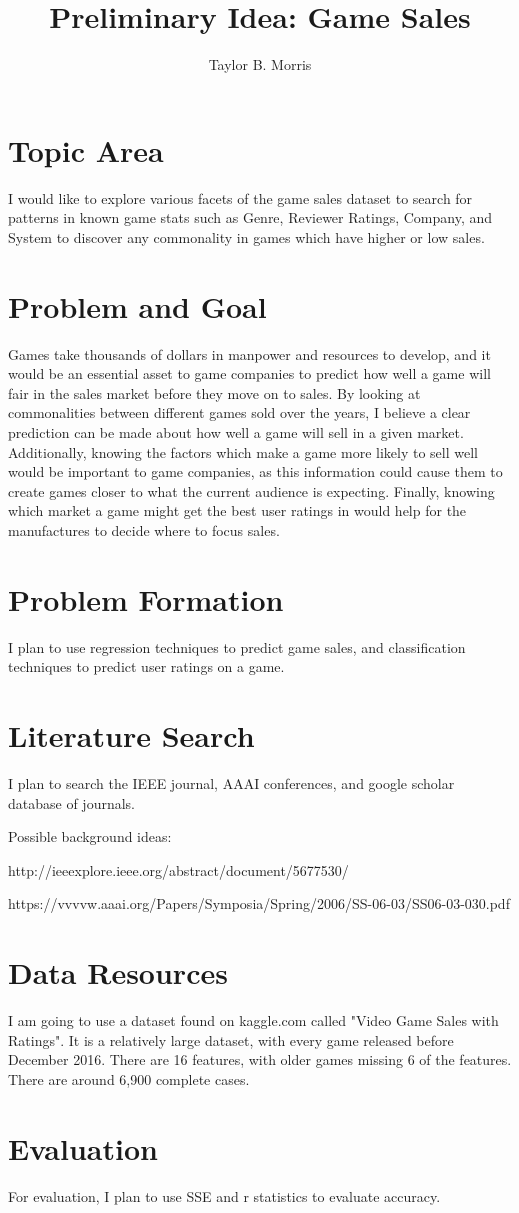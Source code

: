 \documentclass[12pt,letterpaper]{report}
\author{Taylor B. Morris}
\title{Preliminary Idea: Game Sales}
\begin{document}
\maketitle

\section{Topic Area}
I would like to explore various facets of the game sales dataset to search for patterns in known game stats such as Genre, Reviewer Ratings, Company, and System to discover any commonality in games which have higher or low sales. 

\section{Problem and Goal}
Games take thousands of dollars in manpower and resources to develop, and it would be an essential asset to game companies to predict how well a game will fair in the sales market before they move on to sales. By looking at commonalities between different games sold over the years, I believe a clear prediction can be made about how well a game will sell in a given market. Additionally, knowing the factors which make a game more likely to sell well would be important to game companies, as this information could cause them to create games closer to what the current audience is expecting. Finally, knowing which market a game might get the best user ratings in would help for the manufactures to decide where to focus sales.

\section{Problem Formation}
I plan to use regression techniques to predict game sales, and classification techniques to predict user ratings on a game.

\section{Literature Search}
I plan to search the IEEE journal, AAAI conferences, and google scholar database of journals.

Possible background ideas:


http://ieeexplore.ieee.org/abstract/document/5677530/


https://vvvvw.aaai.org/Papers/Symposia/Spring/2006/SS-06-03/SS06-03-030.pdf

\section{Data Resources}
I am going to use a dataset found on kaggle.com called "Video Game Sales with Ratings". It is a relatively large dataset, with every game released  before December 2016. There are 16 features, with older games missing 6 of the features. There are around 6,900 complete cases.

\section{Evaluation}
For evaluation, I plan to use SSE and r statistics to evaluate accuracy.
\end{document}

